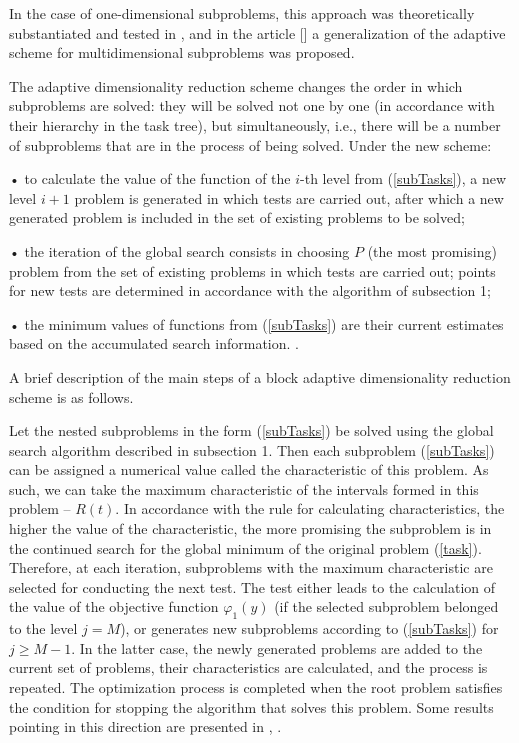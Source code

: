 \documentclass{svproc}
\begin{document}
In the case of one-dimensional subproblems, this approach was theoretically substantiated and tested in \cite{Grishagin2016,Grishagin2016_1,Grishagin2018}, and in the article [] a generalization of the adaptive scheme for multidimensional subproblems was proposed.

   The adaptive dimensionality reduction scheme changes the order in which subproblems are solved: they will be solved not one by one (in accordance with their hierarchy in the task tree), but simultaneously, i.e., there will be a number of subproblems that are in the process of being solved. Under the new scheme:
   
•	to calculate the value of the function of the \(i\)-th level from (\ref{subTasks}), a new level \(i+1\) problem is generated in which tests are carried out, after which a new generated problem is included in the set of existing problems to be solved;   
   
•	the iteration of the global search consists in choosing \(P\) (the most promising) problem from the set of existing problems in which tests are carried out; points for new tests are determined in accordance with the algorithm of subsection 1; 

•	the minimum values of functions from (\ref{subTasks}) are their current estimates based on the accumulated search information. .

A brief description of the main steps of a block adaptive dimensionality reduction scheme is as follows.

Let the nested subproblems in the form (\ref{subTasks}) be solved using the global search algorithm described in subsection 1. Then each subproblem (\ref{subTasks}) can be assigned a numerical value called the characteristic of this problem. As such, we can take the maximum characteristic of the intervals formed in this problem – \(R(t)\). In accordance with the rule for calculating characteristics, the higher the value of the characteristic, the more promising the subproblem is in the continued search for the global minimum of the original problem (\ref{task}). Therefore, at each iteration, subproblems with the maximum characteristic are selected for conducting the next test. The test either leads to the calculation of the value of the objective function \(\varphi_1(y)\) (if the selected subproblem belonged to the level \(j=M\)), or generates new subproblems according to (\ref{subTasks}) for \(j \geqslant  M-1\). In the latter case, the newly generated problems are added to the current set of problems, their characteristics are calculated, and the process is repeated. The optimization process is completed when the root problem satisfies the condition for stopping the algorithm that solves this problem. Some results pointing in this direction are presented in \cite{Ref31}, \cite{Ref32}.
\end{document}
